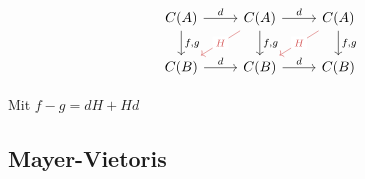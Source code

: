 \documentclass{article}
\begin{document}
	\[\begin{tikzcd}
		{C(A)} & {C(A)} & {C(A)} \\
		{C(B)} & {C(B)} & {C(B)}
		\arrow["d", from=1-1, to=1-2]
		\arrow["{f,g}", from=1-1, to=2-1]
		\arrow["d", from=1-2, to=1-3]
		\arrow["H"{description}, color={rgb,255:red,214;green,92;blue,92}, from=1-2, to=2-1]
		\arrow["{f,g}", from=1-2, to=2-2]
		\arrow["H"{description}, color={rgb,255:red,214;green,92;blue,92}, from=1-3, to=2-2]
		\arrow["{f,g}", from=1-3, to=2-3]
		\arrow["d", from=2-1, to=2-2]
		\arrow["d", from=2-2, to=2-3]
	\end{tikzcd}\]
	
	Mit $f-g = dH + Hd$
	
	\subsection{Mayer-Vietoris}
	\label{sec:mvb1}
	
\end{document}
